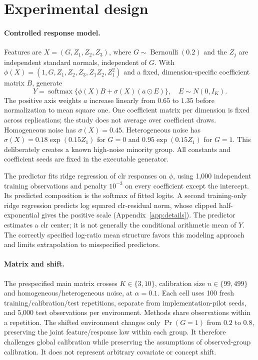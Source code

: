 \section{Experimental design}
\label{sec:design}
\paragraph{Controlled response model.}
Features are $X=(G,Z_1,Z_2,Z_3)$, where $G\sim\operatorname{Bernoulli}(0.2)$ and the $Z_j$ are independent standard normals, independent of $G$. With $\phi(X)=(1,G,Z_1,Z_2,Z_3,Z_1Z_2,Z_1^2)$ and a fixed, dimension-specific coefficient matrix $B$, generate
\begin{equation}
 Y=\operatorname{softmax}\{\phi(X)B+\sigma(X)(a\odot E)\},
 \quad E\sim N(0,I_K).
 \label{eq:dgp}
\end{equation}
The positive axis weights $a$ increase linearly from $0.65$ to $1.35$ before normalization to mean square one. One coefficient matrix per dimension is fixed across replications; the study does not average over coefficient draws. Homogeneous noise has $\sigma(X)=0.45$. Heterogeneous noise has $\sigma(X)=0.18\exp(0.15Z_1)$ for $G=0$ and $0.95\exp(0.15Z_1)$ for $G=1$. This deliberately creates a known high-noise minority group. All constants and coefficient seeds are fixed in the executable generator.

The predictor fits ridge regression of clr responses on $\phi$, using 1,000 independent training observations and penalty $10^{-3}$ on every coefficient except the intercept. Its predicted composition is the softmax of fitted logits. A second training-only ridge regression predicts log squared clr-residual norm, whose clipped half-exponential gives the positive scale (Appendix~\ref{app:details}). The predictor estimates a clr center; it is not generally the conditional arithmetic mean of $Y$. The correctly specified log-ratio mean structure favors this modeling approach and limits extrapolation to misspecified predictors.

\paragraph{Matrix and shift.}
The prespecified main matrix crosses $K\in\{3,10\}$, calibration size $n\in\{99,499\}$ and homogeneous/heterogeneous noise, at $\alpha=0.1$. Each cell uses 100 fresh training/calibration/test repetitions, separate from implementation-pilot seeds, and 5,000 test observations per environment. Methods share observations within a repetition. The shifted environment changes only $\Pr(G=1)$ from $0.2$ to $0.8$, preserving the joint feature/response law within each group. It therefore challenges global calibration while preserving the assumptions of observed-group calibration. It does not represent arbitrary covariate or concept shift.

